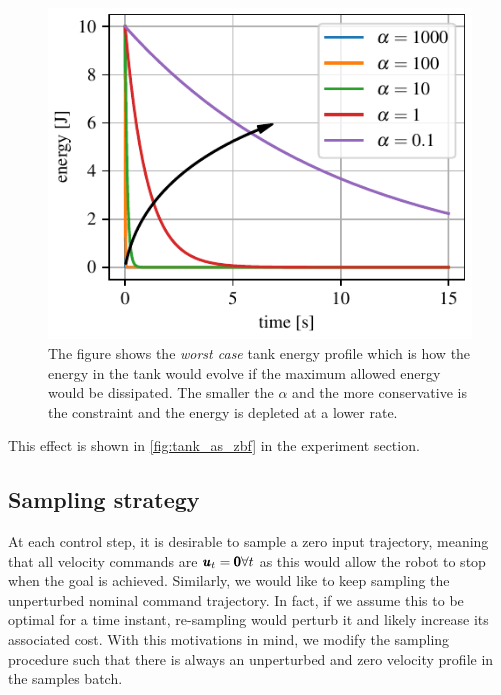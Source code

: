 \begin{figure}[t]
    \centering
    \includegraphics[width=0.8\columnwidth]{figures/worst_case_energy_profile.pdf}
    \caption{The figure shows the \textit{worst case} tank energy profile which is how the energy in the tank would evolve if the maximum allowed energy would be dissipated. The smaller the $\alpha$ and the more conservative is the constraint and the energy is depleted at a lower rate.}
    \label{fig:worst_case_energy_profile}
\end{figure}

This effect is shown in \fig \ref{fig:tank_as_zbf} in the experiment section.

\subsection{Sampling strategy}
At each control step, it is desirable to sample a zero input trajectory, meaning that all velocity commands are $\pmb{u}_t = \pmb{0} \forall t$ as this would allow the robot to stop when the goal is achieved. Similarly, we would like to keep sampling the unperturbed nominal command trajectory. In fact, if we assume this to be optimal for a time instant, re-sampling would perturb it and likely increase its associated cost. With this motivations in mind, we modify the sampling procedure such that there is always an unperturbed and zero velocity profile in the samples batch.

